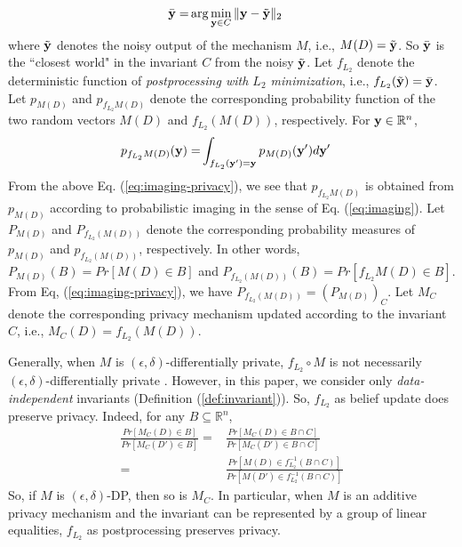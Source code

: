 \documentclass[11pt]{article}
\newcommand\restr[2]{{%
  \left.\kern-\nulldelimiterspace %
  #1 %
  \vphantom{\big|} %
  \right|_{#2} %
  }}
\begin{document}
	\begin{align}
		\bar{\bold{y}} = & \arg\min_{\bold{y}\in C} \|\bold{y}-\tilde{\bold{y}}\|_2
	\end{align}
where $\tilde{\bold{y}}$ denotes the noisy output of the mechanism $M$, i.e., $M(D)= \tilde{\bold{y}}$.  So $\bar{\bold{y}}$ is the ``closest world" in the invariant $C$ from the noisy $\tilde{\bold{y}}$. Let $f_{L_2}$ denote the deterministic function of \emph{postprocessing with  $L_2$ minimization}, i.e., $f_{L_2} (\tilde{\bold{y}}) = \bar{\bold{y}}$.  Let $p_{M(D)}$ and $p_{f_{L_2}M(D)}$ denote the corresponding probability function of the two random vectors $M(D)$ and $f_{L_2}( M(D))$, respectively. For $\bold{y}\in \mathbb{R}^n$, 
	\begin{align} 
		p_{f_{L_2}M(D)}(\bold{y}) = & \int_{f_{L_2}(\bold{y}')= \bold{y}} p_{M(D)}(\bold{y}') d\bold{y}'  \label{eq:imaging-privacy} 
	\end{align}
From the above Eq. (\ref{eq:imaging-privacy}), we see that $p_{f_{L_2}M(D)}$ is obtained from $p_{M(D)}$ according to probabilistic imaging in the sense of Eq. (\ref{eq:imaging}). Let $P_{M(D)}$ and $P_{f_{L_2}(M(D))}$ denote the corresponding probability measures of $p_{M(D)}$ and $p_{f_{L_2}(M(D))}$, respectively.  In other words, $P_{M(D)} (B) = Pr[M(D)\in B]$ and $P_{f_{L_2}(M(D))}(B) = Pr[f_{L_2} M(D)\in B]$.  From Eq, (\ref{eq:imaging-privacy}), we have $P_{f_{L_2}(M(D))} = (P_{M(D)})_C$. 
 Let $M_C$ denote the corresponding privacy mechanism updated according to the invariant $C$, i.e., $M_C(D) = f_{L_2}(M(D))$.  %


Generally, when $M$ is $(\epsilon, \delta)$-differentially private, $f_{L_2}\circ M$ is not necessarily $(\epsilon,\delta)$-differentially private \cite{GongM20}.  However, in this paper, we consider only \emph{data-independent} invariants (Definition (\ref{def:invariant})).  So, $f_{L_2}$ as belief update does preserve privacy. 
 Indeed, for any $B\subseteq \mathbb{R}^n$, 
	\begin{align}
		\frac{Pr[M_C(D)\in B]}{Pr[M_C(D')\in B]} = & 	\frac{Pr[M_C(D)\in B \cap C]}{Pr[M_C(D')\in B\cap C]} \nonumber \\ 
	 = & \frac{Pr[M(D)\in f^{-1}_{L_2}(B \cap C)]}{Pr[M(D')\in f^{-1}_{L_2}(B\cap C)]} \nonumber
	\end{align}
So, if $M$ is $(\epsilon,\delta)$-DP, then so is $M_C$. 
In particular, when  $M$ is an additive privacy mechanism and the invariant can be represented by a group of linear equalities, $f_{L_2}$ as postprocessing  preserves privacy. 
\end{document}
